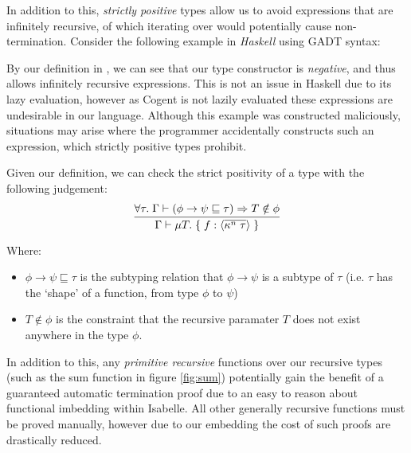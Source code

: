 In addition to this, \textit{strictly positive} types allow us to avoid expressions that are infinitely recursive,
of which iterating over  would potentially cause non-termination. Consider
the following example in \textit{Haskell} using GADT syntax:

\pagebreak



By our definition in , we can see that our type constructor is \textit{negative}, and
thus allows infinitely recursive expressions. This is not an issue in Haskell due to its lazy evaluation,
however as Cogent is not lazily evaluated these expressions are undesirable in our language. 
Although this example was constructed maliciously, situations may arise where the
programmer accidentally constructs such an expression, which strictly positive types prohibit.

Given our definition, we can check the strict positivity of a type with the following judgement:
$$
\infer{
    \Gamma \vdash \mu T.\; \{\; f: \langle \overline{\kappa^n\; \tau} \rangle\; \}
}{
   \forall \tau.\; \Gamma \vdash (\phi \rightarrow \psi \sqsubseteq \tau) \implies T \notin \phi
}
$$

Where:
\begin{itemize}
    \item 
        $\phi \rightarrow \psi \sqsubseteq \tau$ is the subtyping relation that $\phi \rightarrow \psi$
        is a subtype of $\tau$ (i.e. $\tau$ has the `shape' of a function, from type $\phi$ to $\psi$) 
    \item
        $T \notin \phi$ is the constraint that the recursive paramater $T$ does not exist anywhere in the type $\phi$.
\end{itemize}

In addition to this, any \textit{primitive recursive} functions over our recursive types 
(such as the sum function in figure \ref{fig:sum}) potentially gain the benefit of a guaranteed
automatic termination proof due to an easy to reason about functional imbedding within Isabelle.
All other generally recursive functions must be proved manually, however due to our embedding
the cost of such proofs are drastically reduced.

